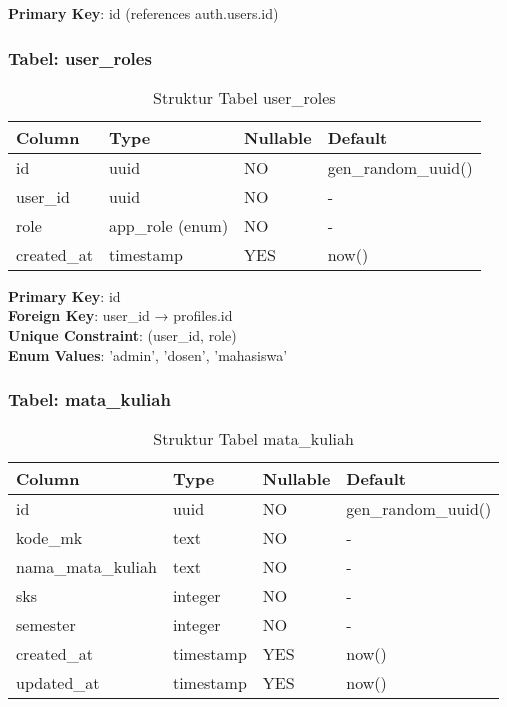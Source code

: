 \documentclass[12pt,a4paper]{article}
\begin{document}
\textbf{Primary Key}: id (references auth.users.id)

\subsubsection{Tabel: user\_roles}

\begin{table}[H]
\centering
\begin{tabular}{|l|l|l|l|}
\hline
\textbf{Column} & \textbf{Type} & \textbf{Nullable} & \textbf{Default} \\
\hline
id & uuid & NO & gen\_random\_uuid() \\
user\_id & uuid & NO & - \\
role & app\_role (enum) & NO & - \\
created\_at & timestamp & YES & now() \\
\hline
\end{tabular}
\caption{Struktur Tabel user\_roles}
\end{table}

\textbf{Primary Key}: id\\
\textbf{Foreign Key}: user\_id → profiles.id\\
\textbf{Unique Constraint}: (user\_id, role)\\
\textbf{Enum Values}: 'admin', 'dosen', 'mahasiswa'

\subsubsection{Tabel: mata\_kuliah}

\begin{table}[H]
\centering
\begin{tabular}{|l|l|l|l|}
\hline
\textbf{Column} & \textbf{Type} & \textbf{Nullable} & \textbf{Default} \\
\hline
id & uuid & NO & gen\_random\_uuid() \\
kode\_mk & text & NO & - \\
nama\_mata\_kuliah & text & NO & - \\
sks & integer & NO & - \\
semester & integer & NO & - \\
created\_at & timestamp & YES & now() \\
updated\_at & timestamp & YES & now() \\
\hline
\end{tabular}
\caption{Struktur Tabel mata\_kuliah}
\end{table}
\end{document}
